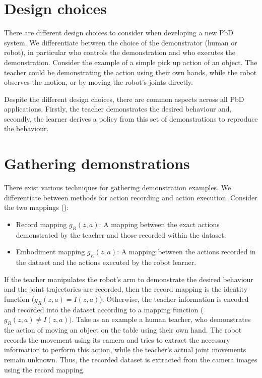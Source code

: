 
\section{Design choices}\label{subsec:Design choices}
There are different design choices to consider when developing a new PbD system.
We differentiate between the choice of the demonstrator (human or robot), in particular who controls the demonstration and who executes the demonstration.
Consider the example of a simple pick up action of an object.
The teacher could be demonstrating the action using their own hands, while the robot observes the motion, or by moving the robot's joints directly.
 
Despite the different design choices, there are common aspects across all PbD applications. 
Firstly, the teacher demonstrates the desired behaviour and, secondly, the learner derives a policy from this set of demonstrations to reproduce the behaviour.

\section{Gathering demonstrations} \label{subsec:Gathering demonstrations}

There exist various techniques for gathering demonstration examples.
We differentiate between methods for action recording and action execution.
Consider the two mappings (\cite{argall2009survey}):
\begin{itemize}
\item Record mapping $g_R(z,a)$: A mapping between the exact actions demonstrated by the teacher and those recorded within the dataset.
\item Embodiment mapping $g_E(z,a)$: A mapping between the actions recorded in the dataset and the actions executed by the robot learner.
\end{itemize}
If the teacher manipulates the robot's arm to demonstrate the desired behaviour and the joint trajectories are recorded, then the record mapping is the identity function ($g_R(z,a) = I(z,a)$).
 Otherwise, the teacher information is encoded and recorded into the dataset according to a mapping function ($g_R(z,a) \neq I(z,a))$.
 Take as an example a human teacher, who demonstrates the action of moving an object on the table using their own hand.
 The robot records the movement using its camera and tries to extract the necessary information to perform this action, while the teacher's actual joint movements remain unknown.
 Thus, the recorded dataset is extracted from the camera images using the record mapping.

